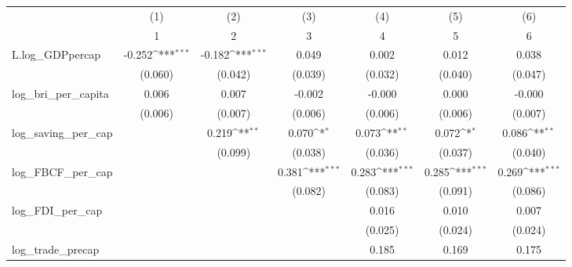 {
\def\sym#1{\ifmmode^{#1}\else\(^{#1}\)\fi}
\begin{tabular}{l*{6}{c}}
\toprule
            &\multicolumn{1}{c}{(1)}&\multicolumn{1}{c}{(2)}&\multicolumn{1}{c}{(3)}&\multicolumn{1}{c}{(4)}&\multicolumn{1}{c}{(5)}&\multicolumn{1}{c}{(6)}\\
            &\multicolumn{1}{c}{1}&\multicolumn{1}{c}{2}&\multicolumn{1}{c}{3}&\multicolumn{1}{c}{4}&\multicolumn{1}{c}{5}&\multicolumn{1}{c}{6}\\
\midrule
L.log\_GDPpercap&      -0.252\sym{***}&      -0.182\sym{***}&       0.049         &       0.002         &       0.012         &       0.038         \\
            &     (0.060)         &     (0.042)         &     (0.039)         &     (0.032)         &     (0.040)         &     (0.047)         \\
\addlinespace
log\_bri\_per\_capita&       0.006         &       0.007         &      -0.002         &      -0.000         &       0.000         &      -0.000         \\
            &     (0.006)         &     (0.007)         &     (0.006)         &     (0.006)         &     (0.006)         &     (0.007)         \\
\addlinespace
log\_saving\_per\_cap&                     &       0.219\sym{**} &       0.070\sym{*}  &       0.073\sym{**} &       0.072\sym{*}  &       0.086\sym{**} \\
            &                     &     (0.099)         &     (0.038)         &     (0.036)         &     (0.037)         &     (0.040)         \\
\addlinespace
log\_FBCF\_per\_cap&                     &                     &       0.381\sym{***}&       0.283\sym{***}&       0.285\sym{***}&       0.269\sym{***}\\
            &                     &                     &     (0.082)         &     (0.083)         &     (0.091)         &     (0.086)         \\
\addlinespace
log\_FDI\_per\_cap&                     &                     &                     &       0.016         &       0.010         &       0.007         \\
            &                     &                     &                     &     (0.025)         &     (0.024)         &     (0.024)         \\
\addlinespace
log\_trade\_precap&                     &                     &                     &       0.185         &       0.169         &       0.175         \\

\end{tabular}}

